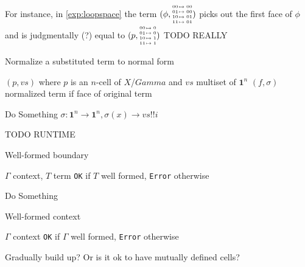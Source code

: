 \documentclass[11pt]{article}
\theoremstyle{definition}
\newcommand{\pint}[1]{\mathbf{1}^{#1}}
\newcommand{\substfour}[4]{\tiny
  \arraycolsep=.4pt\def\arraystretch{1}
  \begin{array}{ll}
    00 &\mapsto {#1} \\
    01 &\mapsto {#2} \\
    10 &\mapsto {#3} \\
    11 &\mapsto {#4} 
  \end{array}
}
\begin{document}
For instance, in \autoref{exp:loopspace} the term
$(\phi,\substfour{00}{00}{01}{01})$ picks out the first face of $\phi$ and
is judgmentally (?) equal to $(p,\substfour{0}{0}{1}{1})$ TODO REALLY

\begin{algorithm}[H]
  \caption{Normalize a substituted term to normal form}\label{alg:normalize}
  \begin{algorithmic}
    \Require $(p, vs)$ where $p$ is an $n$-cell of $X$/$Gamma$ and $vs$ multiset
    of $\pint{n}$
    \Ensure $(f, \sigma)$ normalized term if face of original term
    
    \State Do Something
    \Else{}
    \State $\sigma : \pint{n} \to \pint{n}, \sigma(x) \to vs !! i$
    \State {}
    \EndIf
    \EndProcedure

  \end{algorithmic}
\end{algorithm}

TODO RUNTIME








\begin{algorithm}[H]
  \caption{Well-formed boundary}\label{alg:wellformedboundary}
  \begin{algorithmic}
    \Require $\Gamma$ context, $T$ term
    \Ensure \texttt{OK} if $T$ well formed, \texttt{Error} otherwise

    \State Do Something
    \EndProcedure
  \end{algorithmic}
\end{algorithm}

\begin{algorithm}[H]
  \caption{Well-formed context}\label{alg:wellformedcontext}
  \begin{algorithmic}
    \Require $\Gamma$ context
    \Ensure \texttt{OK} if $\Gamma$ well formed, \texttt{Error} otherwise

    \State Gradually build up? Or is it ok to have mutually defined cells?
    \EndProcedure
  \end{algorithmic}
\end{algorithm}
\end{document}

